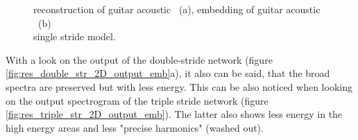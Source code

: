 \begin{figure}[htb!]
    \centering
    \captionsetup{justification=centering}
    \caption{reconstruction of guitar acoustic ~(a), embedding of guitar acoustic ~(b)\\single stride model.}
    \label{fig:res_single_str_2D_output_emb}
\end{figure}

With a look on the output of the double-stride network (figure \ref{fig:res_double_str_2D_output_emb}a), it also can be said, that the broad spectra are preserved but with less energy. This can be also noticed when looking on the output spectrogram of the triple stride network (figure \ref{fig:res_triple_str_2D_output_emb}). The latter also shows less energy in the high energy areas and less "precise harmonics" (washed out). 

